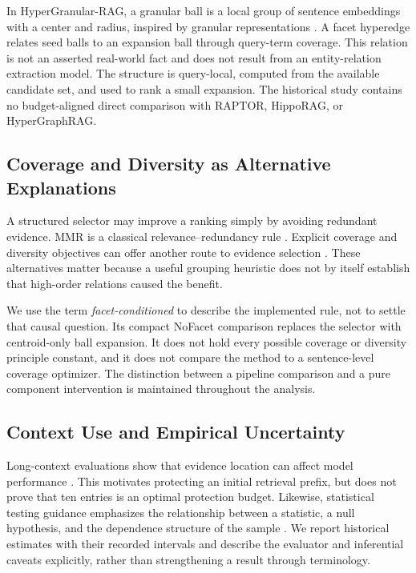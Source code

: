 \documentclass[11pt,a4paper]{article}
\newcommand{\hgrag}{HyperGranular-RAG\xspace}
\begin{document}
In \hgrag, a granular ball is a local group of sentence embeddings with a
center and radius, inspired by granular representations
\citep{xia2019granularball}. A facet hyperedge relates seed balls to an
expansion ball through query-term coverage. This relation is not an asserted
real-world fact and does not result from an entity-relation extraction model.
The structure is query-local, computed from the available candidate set, and
used to rank a small expansion. The historical study contains no
budget-aligned direct comparison with RAPTOR, HippoRAG, or HyperGraphRAG.

\subsection{Coverage and Diversity as Alternative Explanations}
A structured selector may improve a ranking simply by avoiding redundant
evidence. MMR is a classical relevance--redundancy rule
\citep{carbonell1998mmr}. Explicit coverage and diversity objectives can offer
another route to evidence selection \citep{lin2011submodular}.
These alternatives matter because a useful grouping heuristic does not by
itself establish that high-order relations caused the benefit.

We use the term \emph{facet-conditioned} to describe the implemented rule,
not to settle that causal question. Its compact NoFacet comparison replaces
the selector with centroid-only ball expansion. It does not hold every
possible coverage or diversity principle constant, and it does not compare
the method to a sentence-level coverage optimizer. The distinction between
a pipeline comparison and a pure component intervention is maintained
throughout the analysis.

\subsection{Context Use and Empirical Uncertainty}
Long-context evaluations show that evidence location can affect model
performance \citep{liu2024lostmiddle}. This motivates protecting an initial
retrieval prefix, but does not prove that ten entries is an optimal protection
budget. Likewise, statistical testing guidance emphasizes the relationship
between a statistic, a null hypothesis, and the dependence structure of the
sample \citep{dror2018hitchhiker}. We report historical estimates with their
recorded intervals and describe the evaluator and inferential caveats
explicitly, rather than strengthening a result through terminology.
\end{document}
